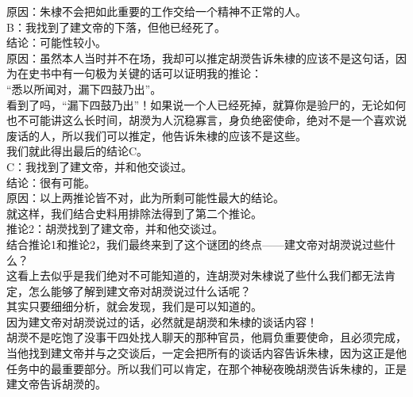 \begin{multicols}{\theparacolNo}
原因：朱棣不会把如此重要的工作交给一个精神不正常的人。\\

B：我找到了建文帝的下落，但他已经死了。\\

结论：可能性较小。\\

原因：虽然本人当时并不在场，我却可以推定胡濙告诉朱棣的应该不是这句话，因为在史书中有一句极为关键的话可以证明我的推论：\\

“悉以所闻对，漏下四鼓乃出”。\\

看到了吗，“漏下四鼓乃出”！如果说一个人已经死掉，就算你是验尸的，无论如何也不可能讲这么长时间，胡濙为人沉稳寡言，身负绝密使命，绝对不是一个喜欢说废话的人，所以我们可以推定，他告诉朱棣的应该不是这些。\\

我们就此得出最后的结论C。\\

C：我找到了建文帝，并和他交谈过。\\

结论：很有可能。\\

原因：以上两推论皆不对，此为所剩可能性最大的结论。\\

就这样，我们结合史料用排除法得到了第二个推论。\\

推论2：胡濙找到了建文帝，并和他交谈过。\\

结合推论1和推论2，我们最终来到了这个谜团的终点——建文帝对胡濙说过些什么？\\

这看上去似乎是我们绝对不可能知道的，连胡濙对朱棣说了些什么我们都无法肯定，怎么能够了解到建文帝对胡濙说过什么话呢？\\

其实只要细细分析，就会发现，我们是可以知道的。\\

因为建文帝对胡濙说过的话，必然就是胡濙和朱棣的谈话内容！\\

胡濙不是吃饱了没事干四处找人聊天的那种官员，他肩负重要使命，且必须完成，当他找到建文帝并与之交谈后，一定会把所有的谈话内容告诉朱棣，因为这正是他任务中的最重要部分。所以我们可以肯定，在那个神秘夜晚胡濙告诉朱棣的，正是建文帝告诉胡濙的。\\


\end{multicols}
